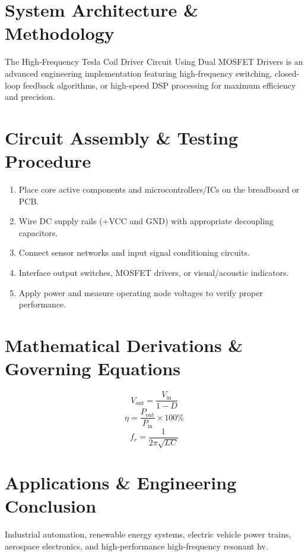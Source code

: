 \documentclass[11pt,a4paper]{article}
\begin{document}
\section{System Architecture \& Methodology}
The High-Frequency Tesla Coil Driver Circuit Using Dual MOSFET Drivers is an advanced engineering implementation featuring high-frequency switching, closed-loop feedback algorithms, or high-speed DSP processing for maximum efficiency and precision.

\section{Circuit Assembly \& Testing Procedure}
\begin{enumerate}
    \item Place core active components and microcontrollers/ICs on the breadboard or PCB.
    \item Wire DC supply rails (+VCC and GND) with appropriate decoupling capacitors.
    \item Connect sensor networks and input signal conditioning circuits.
    \item Interface output switches, MOSFET drivers, or visual/acoustic indicators.
    \item Apply power and measure operating node voltages to verify proper performance.
\end{enumerate}

\section{Mathematical Derivations \& Governing Equations}
\begin{equation}
V_{\text{out}} = \frac{V_{\text{in}}}{1 - D}
\end{equation}
\begin{equation}
\eta = \frac{P_{\text{out}}}{P_{\text{in}}} \times 100\%
\end{equation}
\begin{equation}
f_r = \frac{1}{2\pi \sqrt{L C}}
\end{equation}

\section{Applications \& Engineering Conclusion}
Industrial automation, renewable energy systems, electric vehicle power trains, aerospace electronics, and high-performance high-frequency resonant hv.
\end{document}

